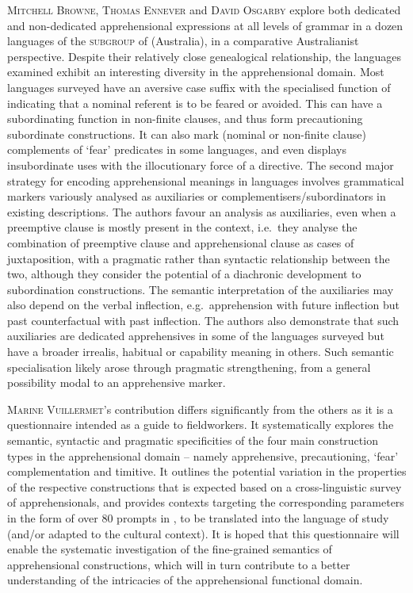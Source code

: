 \documentclass[output=paper,colorlinks,citecolor=brown]{langscibook}
\begin{document}
\textsc{Mitchell} \textsc{Browne}, \textsc{Thomas} \textsc{Ennever} and \textsc{David} \textsc{Osgarby} explore both dedicated and non-dedicated apprehensional expressions at all levels of grammar in a dozen languages of the \textsc{ subgroup} of  (Australia), in a comparative Australianist perspective. Despite their relatively close genealogical relationship, the languages examined exhibit an interesting diversity in the apprehensional domain. Most  languages surveyed have an aversive case suffix with the specialised function of indicating that a nominal referent is to be feared or avoided. This can have a subordinating function in non-finite clauses, and thus form precautioning subordinate constructions. It can also mark (nominal or non-finite clause) complements of `fear' predicates in some languages, and even displays insubordinate uses with the illocutionary force of a directive. The second major strategy for encoding apprehensional meanings in  languages involves grammatical markers variously analysed as auxiliaries or complementisers/subordinators in existing descriptions. The authors favour an analysis as auxiliaries, even when a preemptive clause is mostly present in the context, i.e.\ they analyse the combination of preemptive clause and apprehensional clause as cases of juxtaposition, with a pragmatic rather than syntactic relationship between the two, although they consider the potential of a diachronic development to subordination constructions. The semantic interpretation of the auxiliaries may also depend on the verbal inflection, e.g.\  apprehension with future inflection but past counterfactual with past inflection. The authors also demonstrate that such auxiliaries are dedicated apprehensives in some of the languages surveyed but have a broader irrealis, habitual or capability meaning in others. Such semantic specialisation likely arose through pragmatic strengthening, from a general possibility modal to an apprehensive marker.


\textsc{Marine Vuillermet}'s contribution differs significantly from the others as it is a questionnaire intended as a guide to fieldworkers. It systematically explores the semantic, syntactic and pragmatic specificities of the four main construction types in the apprehensional domain – namely apprehensive, precautioning, `fear' complementation and timitive. It outlines the potential variation in the properties of the respective constructions that is expected based on a cross-linguistic survey of apprehensionals, and provides contexts targeting the corresponding parameters in the form of over 80 prompts in , to be translated into the language of study (and/or adapted to the cultural context). It is hoped that this questionnaire will enable the systematic investigation of the fine-grained semantics of apprehensional constructions, which will in turn contribute to a better understanding of the intricacies of the apprehensional functional domain.
\end{document}
